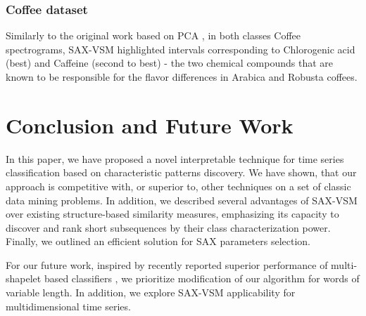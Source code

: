 \documentclass[conference]{IEEEtran}
\begin{document}
\subsubsection{Coffee dataset}
Similarly to the original work based on PCA \cite{coffee}, in both classes Coffee spectrograms, 
SAX-VSM highlighted intervals corresponding to Chlorogenic acid (best) and Caffeine 
(second to best) - the two chemical compounds that are known to be responsible for the flavor 
differences in Arabica and Robusta coffees.

\section{Conclusion and Future Work} \label{conclusion}
In this paper, we have proposed a novel interpretable technique for time series classification
based on characteristic patterns discovery. We have shown, that our approach is competitive with, 
or superior to, other techniques on a set of classic data mining problems. In addition, 
we described several advantages of SAX-VSM over existing structure-based similarity measures,
emphasizing its capacity to discover and rank short subsequences by their class characterization
power. Finally, we outlined an efficient solution for SAX parameters selection.

For our future work, inspired by recently reported superior performance of multi-shapelet based 
classifiers \cite{bagnal}, we prioritize modification of our algorithm for words of variable length.
In addition, we explore SAX-VSM applicability for multidimensional time series. 

%
%
\end{document}
